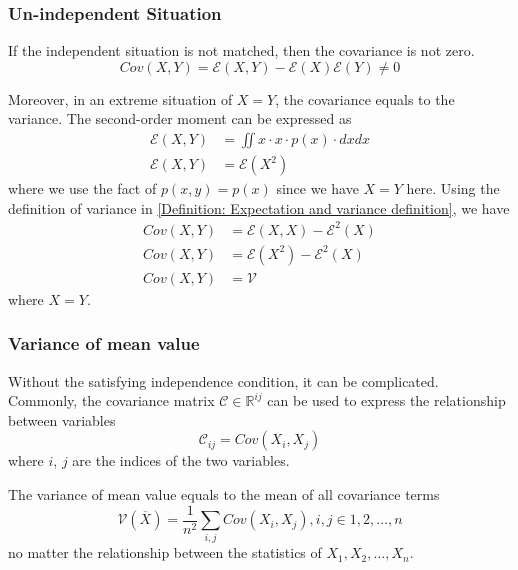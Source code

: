 \documentclass[./main.tex]{subfiles}
\begin{document}
\subsubsection{Un-independent Situation}

If the independent situation is not matched, then the covariance is not zero.
\begin{equation*}
    Cov(X, Y) =
    \mathcal{E}(X, Y) - \mathcal{E}(X)\mathcal{E}(Y)
    \neq 0
\end{equation*}

Moreover, in an extreme situation of $X=Y$, the covariance equals to the variance.
The second-order moment can be expressed as
\begin{align*}
    \mathcal{E}(X, Y) & = \iint x \cdot x \cdot p(x) \cdot dx dx \\
    \mathcal{E}(X, Y) & = \mathcal{E}(X^2)
\end{align*}
where we use the fact of $p(x, y) = p(x)$ since we have $X=Y$ here.
Using the definition of variance in \eqref{Definition: Expectation and variance definition}, we have
\begin{align*}
    Cov(X, Y) & = \mathcal{E}(X, X) - \mathcal{E}^2(X) \\
    Cov(X, Y) & = \mathcal{E}(X^2) - \mathcal{E}^2(X)  \\
    Cov(X, Y) & = \mathcal{V}
\end{align*}
where $X=Y$.

\subsubsection{Variance of mean value}

Without the satisfying independence condition, it can be complicated.
Commonly, the covariance matrix $\mathcal{C} \in \mathbb{R}^{ij}$ can be used to express the relationship between variables
\begin{equation*}
    \mathcal{C}_{ij} = Cov(X_i, X_j)
\end{equation*}
where $i$, $j$ are the indices of the two variables.
\begin{lemma}
    \label{Lemma: Variance of mean value}
    The variance of mean value equals to the mean of all covariance terms
    \begin{equation*}
        \mathcal{V}(\overline{X}) =
        \frac{1}{n^2} \sum_{i, j} Cov(X_i, X_j),
        i, j \in 1, 2, \dots, n
    \end{equation*}
    no matter the relationship between the statistics of $X_1, X_2, \dots, X_n$.
\end{lemma}
\end{document}

